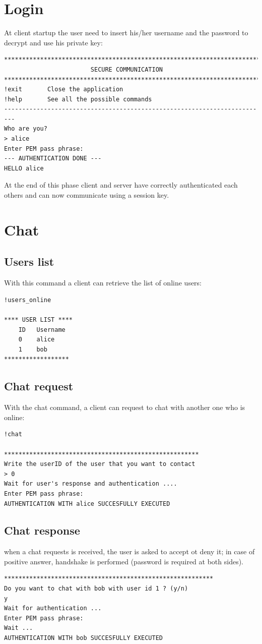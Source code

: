 \documentclass[11pt]{report}
\begin{document}
\section{Login}
At client startup the user need to insert his/her username and the password to decrypt and use his private key:
\begin{lstlisting}
*********************************************************************** 
                        SECURE COMMUNICATION 
*********************************************************************** 
!exit       Close the application
!help       See all the possible commands
-------------------------------------------------------------------------
Who are you? 
> alice
Enter PEM pass phrase:
--- AUTHENTICATION DONE --- 
HELLO alice
\end{lstlisting}
At the end of this phase client and server have correctly authenticated each others and can now communicate
using a session key.
\newpage
\section{Chat}
\subsection*{Users list}
With this command a client can retrieve the list of online users:
\begin{lstlisting}
!users_online

**** USER LIST **** 
	ID 	 Username
	0 	 alice
	1 	 bob
****************** 
\end{lstlisting}

\subsection*{Chat request}
With the chat command, a client can request to chat with another one who is online:
\begin{lstlisting}
!chat
	
******************************************************
Write the userID of the user that you want to contact
> 0
Wait for user's response and authentication ....
Enter PEM pass phrase:
AUTHENTICATION WITH alice SUCCESFULLY EXECUTED 
\end{lstlisting}
\subsection*{Chat response}
when a chat requests is received, the user is asked to accept ot deny it; in case of positive answer,
handshake is performed (password is required at both sides).
\begin{lstlisting}
**********************************************************
Do you want to chat with bob with user id 1 ? (y/n)
y
Wait for authentication ... 
Enter PEM pass phrase:
Wait ...
AUTHENTICATION WITH bob SUCCESFULLY EXECUTED 
\end{lstlisting}
\newpage
\end{document}

